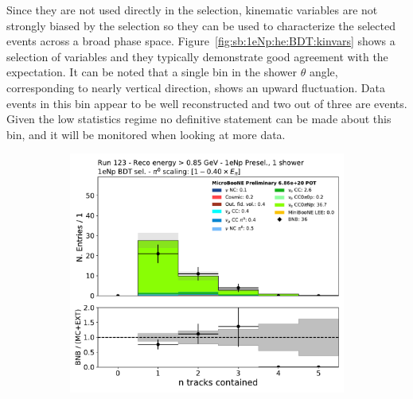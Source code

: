Since they are not used directly in the selection, kinematic variables are not strongly biased by the selection so they can be used to characterize the selected \nuecc events across a broad phase space. Figure~\ref{fig:sb:1eNp:he:BDT:kinvars} shows a selection of variables and they typically demonstrate good agreement with the expectation. It can be noted that a single bin in the shower $\theta$ angle, corresponding to nearly vertical direction, shows an upward fluctuation. Data events in this bin appear to be well reconstructed and two out of three are \npsel events. Given the low statistics regime no definitive statement can be made about this bin, and it will be monitored when looking at more data.

\begin{figure}[H]
    \begin{center}
    \begin{subfigure}{0.4\textwidth}
    \includegraphics[width=1.00\textwidth]{Sidebands/Figures/1eNp/HighEnergy/HiEext_NPOneShr_NPBDT_pi0e040/n_tracks_contained.pdf}
    \end{subfigure}
    \begin{subfigure}{0.4\textwidth}

\end{subfigure}
\end{center}
\end{figure}
